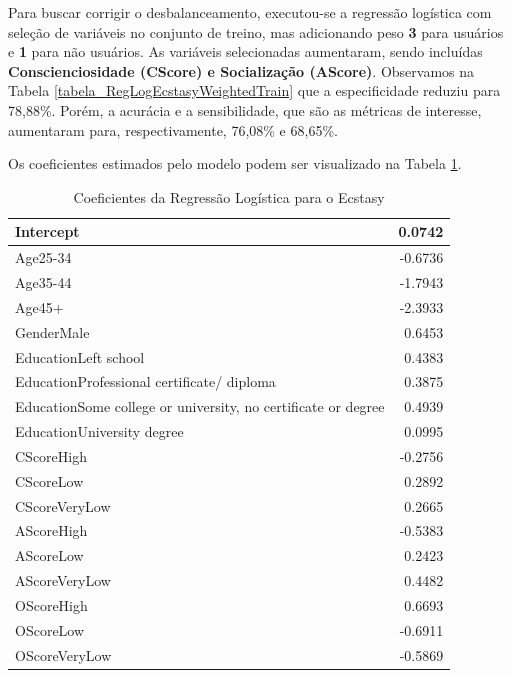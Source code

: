 \documentclass[
	article,			%
	11pt,				%
	oneside,			%
	a4paper,			%
	english,			%
	brazil,				%
	sumario=tradicional
	]{abntex2}
\begin{document}
Para buscar corrigir o desbalanceamento, executou-se a regressão logística com seleção de variáveis no conjunto de treino, mas adicionando peso \textbf{3} para usuários e \textbf{1} para não usuários. As variáveis selecionadas aumentaram, sendo incluídas \textbf{Conscienciosidade (CScore) e Socialização (AScore)}. Observamos na Tabela \ref{tabela_RegLogEcstasyWeightedTrain} que a especificidade reduziu para 78,88\%. Porém, a acurácia e a sensibilidade, que são as métricas de interesse, aumentaram para, respectivamente, 76,08\% e 68,65\%. 

Os coeficientes estimados pelo modelo podem ser visualizado na Tabela \ref{coef_reglog_ecstasy}.

\begin{table}[H]
\centering
\begin{tabular}{|l|r|}
\hline
Intercept                                                     & 0.0742 \\ \hline
Age25-34                                                      & -0.6736 \\ \hline
Age35-44                                                      & -1.7943 \\ \hline    
Age45+                                                        & -2.3933 \\ \hline
GenderMale                                                    & 0.6453  \\ \hline
EducationLeft school                                          & 0.4383  \\ \hline
EducationProfessional certificate/ diploma                    & 0.3875  \\ \hline
EducationSome college or university, no certificate or degree & 0.4939  \\ \hline
EducationUniversity degree                                    & 0.0995  \\ \hline
CScoreHigh                                                    & -0.2756 \\ \hline
CScoreLow                                                     & 0.2892  \\ \hline
CScoreVeryLow                                                 & 0.2665  \\ \hline
AScoreHigh                                                    & -0.5383 \\ \hline
AScoreLow                                                     & 0.2423  \\ \hline
AScoreVeryLow                                                 & 0.4482  \\ \hline
OScoreHigh                                                    & 0.6693  \\ \hline
OScoreLow                                                     & -0.6911 \\ \hline
OScoreVeryLow                                                 & -0.5869 \\ \hline
\end{tabular}
\caption{Coeficientes da Regressão Logística para o Ecstasy}
\label{coef_reglog_ecstasy}
\end{table}
\end{document}

